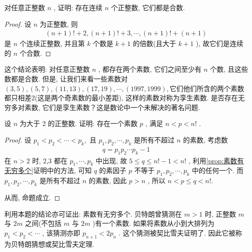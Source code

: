 \begin{example}
	对任意正整数 $n$ , 证明: 存在连续 $n$ 个正整数, 它们都是合数.
\end{example}
\begin{proof}
	设 $n$ 为正整数, 则
	\begin{align*}
		(n+1)!+2,(n+1)!+3, \cdots,(n+1)!+(n+1)
	\end{align*}
	是 $n$ 个连续正整数, 并且第 $k$ 个数是 $k+1$ 的倍数(且大于 $k+1$ ), 故它们是连续的 $n$ 个合数.
\end{proof}
\begin{note}
	这个结论表明: 对任意正整数 $n$ , 都存在两个素数, 它们之间至少有 $n$ 个数, 且这些数都是合数. 但是, 让我们来看一些素数对$(3, 5), (5, 7), (11,13),(17,19),\cdots,(1997,1999),$它们他们所含的两个素数都只相差$2$(这是两个奇素数的最小差距), 这样的素数对称为孪生素数. 是否存在无穷多对素数, 它们是孪生素数？这是数论中一个未解决的著名问题.
\end{note}

\begin{example}
	设 $n$ 为大于 2 的正整数. 证明: 存在一个素数 $p$ , 满足 $n<p<n!$ .
\end{example}
\begin{proof}
	设 $p_{1}<p_{2}<\cdots<p_{k} , $ 且 $p_{1}, p_{2}, \cdots, p_{k}$ 是所有不超过 $n$ 的素数, 考虑数
	\begin{align*}
		q=p_{1} p_{2} \cdots p_{k}-1
	\end{align*}
	在 $n>2$ 时,  2,3 都在 $p_{1}, \cdots, p_{k}$ 中出现, 故 $5 \leqslant q \leqslant n!-1<n!$ , 利用\autoref{prop:素数有无穷多个}证明中的方法, 可知 $q$ 的素因子 $p$ 不等于 $p_{1}, p_{2}, \cdots, p_{k}$ 中的任何一个. 而 $p_{1}, p_{2}, \cdots, p_{k}$ 是所有不超过 $n$ 的素数, 因此 $p>n$ , 所以 $n<p \leqslant q<n!$.

	从而, 命题成立.
\end{proof}
\begin{note}
	利用本题的结论亦可证出: 素数有无穷多个. 贝特朗曾猜测在 $m>1$ 时, 正整数 $m$ 与 $2 m$ 之间(不包括 $m$ 与 $2 m$ )有一个素数. 如果将素数从小到大排列为 $p_{1}<p_{2}<\cdots$ , 该猜测亦即 $p_{n+1}<2 p_{n}$ . 这个猜测被契比雪夫证明了. 因此它被称为贝特朗猜想或契比雪夫定理.
\end{note}

